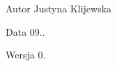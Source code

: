 \begin{DoxyAuthor}{Autor}
Justyna Klijewska 
\end{DoxyAuthor}
\begin{DoxyDate}{Data}
09.. 
\end{DoxyDate}
\begin{DoxyVersion}{Wersja}
0. 
\end{DoxyVersion}
